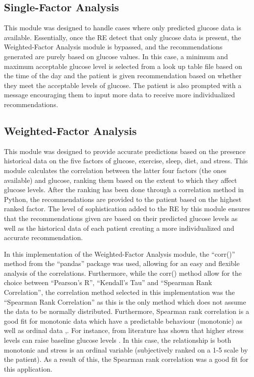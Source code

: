 \subsection{Single-Factor Analysis}
\label{subsec:single_factor_analysis}
This module was designed to handle cases where only predicted glucose data is available. Essentially, once the RE detect that only glucose data is present, the Weighted-Factor Analysis module is bypassed, and the recommendations generated are purely based on glucose values. In this case, a minimum and maximum acceptable glucose level is selected from a look up table file based on the time of the day and the patient is given recommendation based on whether they meet the acceptable levels of glucose. The patient is also prompted with a message encouraging them to input more data to receive more individualized recommendations.

\subsection{Weighted-Factor Analysis}
\label{subsec:weighted_factor_analysis}
This module was designed to provide accurate predictions based on the presence historical data on the five factors of glucose, exercise, sleep, diet, and stress. This module calculates the correlation between the latter four factors (the ones available) and glucose, ranking them based on the extent to which they affect glucose levels. After the ranking has been done through a correlation method in Python, the recommendations are provided to the patient based on the highest ranked factor. The level of sophistication added to the RE by this module ensures that the recommendations given are based on their predicted glucose levels as well as the historical data of each patient creating a more individualized and accurate recommendation.

In this implementation of the Weighted-Factor Analysis module, the “corr()” method from the “pandas” package was used, allowing for an easy and flexible analysis of the correlations. Furthermore, while the corr() method allow for the choice between “Pearson’s R”, “Kendall’s Tau” and “Spearman Rank Correlation”, the correlation method selected in this implementation was the “Spearman Rank Correlation”  as this is the only method which does not assume the data to be normally distributed. Furthermore, Spearman rank correlation is a good fit for monotonic data which have a predictable behaviour (monotonic) as well as ordinal data \cite{13},\cite{14}. For instance, from literature has shown that higher stress levels can raise baseline glucose levels \cite{15}. In this case, the relationship is both monotonic and stress is an ordinal variable (subjectively ranked on a 1-5 scale by the patient). As a result of this, the Spearman rank correlation was a good fit for this application.

